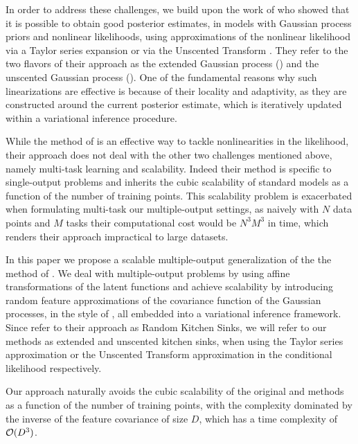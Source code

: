In order to address these challenges, we build upon the work of  
\citet{steinberg-bonilla-nips-2014} who showed that it is possible to obtain
good posterior estimates, in models with Gaussian process priors and 
nonlinear likelihoods, using  approximations of the nonlinear  likelihood  
via a Taylor series expansion or via the Unscented Transform \citep{Julier2004}. 
They refer to the two  flavors of their approach as the 
extended Gaussian process (\egp) and the unscented Gaussian process (\ugp).
One of the fundamental reasons why such linearizations are effective is 
because of their locality and adaptivity, as they are 
constructed around the current posterior estimate, 
which is iteratively updated within a variational inference procedure.

While the method of \citet{steinberg-bonilla-nips-2014} is an
effective way to tackle nonlinearities in the likelihood, their approach  
does not deal with the other two challenges mentioned above, namely multi-task learning 
and scalability. Indeed their method is specific to single-output problems and 
inherits the cubic scalability of standard \gp models as a function of the number of 
training points. This scalability problem is exacerbated when formulating  multi-task 
our multiple-output settings, as  naively with $N$ data points and $M$ tasks their
computational cost would be $N^3M^3$ in time, 
which renders their approach impractical to large datasets.  

In this paper we propose a scalable multiple-output generalization  
of the the method of \citet{steinberg-bonilla-nips-2014}.
We deal with multiple-output problems  by using 
affine transformations of the latent functions and 
achieve scalability by introducing random feature approximations 
 of the covariance function of the Gaussian processes, in the style of  \citet{rahimi-recht-nips-2007}, 
 all embedded into a variational inference framework. Since 
\citet{rahimi-recht-nips-2007} refer to their approach as 
Random Kitchen Sinks,  we will refer to our methods 
as extended and unscented kitchen sinks, when using 
the Taylor series approximation or the Unscented Transform approximation 
in the conditional likelihood respectively. 
 
Our approach naturally avoids the cubic scalability of the 
original \egp and \ugp methods \citep{steinberg-bonilla-nips-2014} as a function of the number 
of training points, with the complexity dominated by 
the inverse of the feature covariance of size $D$, which has a time complexity of
$\mathcal{O}(D^3)$. 

